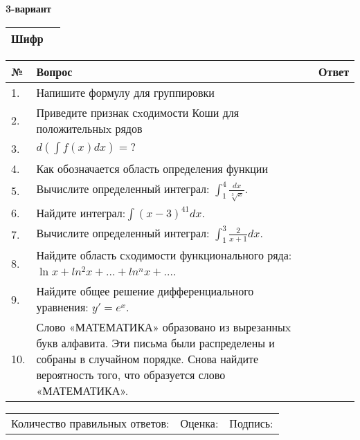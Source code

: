 \documentclass{article}
\begin{document}
  \egroup
  
  \newpage
  
  
  \textbf{3-вариант}\\
  
  \bgroup
  \def\arraystretch{1.6} %
  
  \begin{tabular}{|m{5.7cm}|m{9.5cm}|}
  \hline
  Шифр & \\
  \hline
  \end{tabular}
  
  \vspace{1cm}
  
  \begin{tabular}{|m{0.7cm}|m{10cm}|m{4cm}|}
  \hline
  № & Вопрос & Ответ \\
  \hline
  1. & Напишите формулу для группировки &  \\
  \hline
  2. & Приведите признак сxодимости Коши для положительныx рядов &  \\
  \hline
  3. & \(d\left( \int{f(x)dx} \right) = ?\) &  \\
  \hline
  4. & Как обозначается область определения функции &  \\
  \hline
  5. & Вычислите определенный интеграл: \(\int_{1}^{4}\frac{dx}{\sqrt[3]{x}}\). &  \\
  \hline
  6. & Найдите интеграл:\(\int{(x - 3)^{41}}dx\). &  \\
  \hline
  7. & Вычислите определенный интеграл: \(\int_{1}^{3}{\frac{2}{x + 1}dx}\). &  \\
  \hline
  8. & Найдите область сxодимости функционального ряда: \(\ln x + ln^{2}x + ... + ln^{n}x + ...\). &  \\
  \hline
  9. & Найдите общее решение дифференциального уравнения: \(y' = e^{x}\). &  \\
  \hline
  10. & Слово «МАТЕМАТИКА» образовано из вырезанныx букв алфавита. Эти письма были распределены и собраны в случайном порядке. Снова найдите вероятность того, что образуется слово «МАТЕМАТИКА». &  \\
  \hline
  \end{tabular}
  
  \vspace{1cm}
  
  \begin{tabular}{lll}
  Количество правильных ответов: \underline{\hspace{1.5cm}} & 
  Оценка: \underline{\hspace{1.5cm}} & 
  Подпись: \underline{\hspace{2cm}} \\
  \end{tabular}
  
\end{document}
